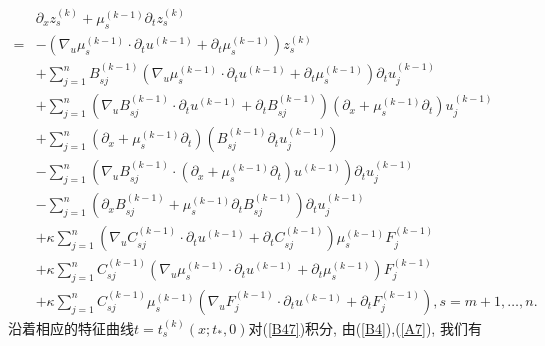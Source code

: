 \documentclass[notitlepage,cs4size,punct,oneside]{ctexrep}
\numberwithin{equation}{chapter}
\theoremstyle{mystyle}
\begin{document}
\begin{align}
      & \partial_{x} z_{s}^{(k)}+\mu_{s}^{(k-1)} \partial_{t} z_{s}^{(k)}\nonumber                                                                                                                      \\
    = & -\left(\nabla_{u} \mu_{s}^{(k-1)} \cdot \partial_{t} u^{(k-1)} + \partial _{t} \mu _{s} ^{(k-1)}\right) z_{s}^{(k)}\nonumber                                                                    \\
      & +\sum_{j=1}^{n} B_{s j}^{(k-1)}\left(\nabla_{u} \mu_{s}^{(k-1)} \cdot \partial_{t} u^{(k-1)} + \partial _{t} \mu _{s} ^{(k-1)}\right) \partial_{t} u_{j}^{(k-1)}\nonumber                       \\
      & +\sum_{j=1}^{n}\left(\nabla_{u} B_{s j}^{(k-1)} \cdot \partial_{t} u^{(k-1)} + \partial_{t} B_{sj}^{(k-1)}\right)\left(\partial_{x}+\mu_{s}^{(k-1)} \partial_{t} \right) u_{j}^{(k-1)}\nonumber \\
      & +\sum_{j=1}^{n}\left(\partial_{x}+\mu_{s}^{(k-1)} \partial_{t}\right)\left(B_{s j}^{(k-1)} \partial_{t} u_{j}^{(k-1)}\right)\nonumber                                                           \\
      & -\sum_{j=1}^{n}\left(\nabla_{u} B_{s j}^{(k-1)} \cdot\left(\partial_{x}+\mu_{s}^{(k-1)} \partial_{t}\right) u^{(k-1)}\right) \partial_{t} u_{j}^{(k-1)}\nonumber                                \\
      & -\sum_{j=1}^{n}\left(\partial_{x}B_{s j}^{(k-1)}+\mu_{s}^{(k-1)} \partial_{t}B_{s j}^{(k-1)} \right) \partial_{t} u_{j}^{(k-1)}\nonumber                                                        \\
      & +\kappa \sum_{j=1}^{n}\left(\nabla_{u} C_{s j}^{(k-1)} \cdot \partial_{t} u^{(k-1)} + \partial_{t} C_{s j}^{(k-1)}\right) \mu_{s}^{(k-1)} F_j^{(k-1)}\nonumber                                  \\
      & +\kappa \sum_{j=1}^{n} C_{s j}^{(k-1)}\left(\nabla_{u} \mu_{s}^{(k-1)} \cdot \partial_{t} u^{(k-1)} + \partial _{t} \mu _{s} ^{(k-1)}\right) F_j^{(k-1)}\nonumber                               \\
      & +\kappa \sum_{j=1}^{n} C_{s j}^{(k-1)}\mu_{s}^{(k-1)} \left(\nabla_{u} F_{j}^{(k-1)} \cdot \partial_{t} u^{(k-1)} + \partial _{t} F_{j} ^{(k-1)}\right)
    , s=m+1, \ldots, n .\label{B48}
\end{align}
沿着相应的特征曲线$t=t_{s}^{(k)}\left(x ; t_{*}, 0\right)$对(\ref{B47})积分, 由(\ref{B4}),(\ref{A7}), 我们有
\end{document}

